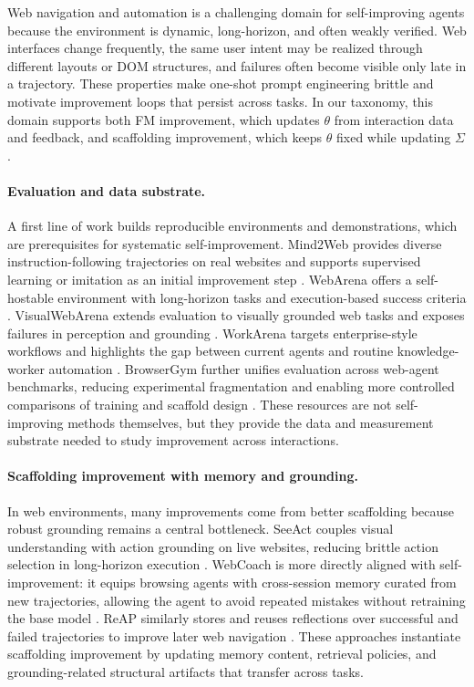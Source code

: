 Web navigation and automation is a challenging domain for self-improving agents because the environment is dynamic, long-horizon, and often weakly verified. Web interfaces change frequently, the same user intent may be realized through different layouts or DOM structures, and failures often become visible only late in a trajectory. These properties make one-shot prompt engineering brittle and motivate improvement loops that persist across tasks. In our taxonomy, this domain supports both FM improvement, which updates $\theta$ from interaction data and feedback, and scaffolding improvement, which keeps $\theta$ fixed while updating $\Sigma$.

\paragraph{Evaluation and data substrate.}
A first line of work builds reproducible environments and demonstrations, which are prerequisites for systematic self-improvement. Mind2Web provides diverse instruction-following trajectories on real websites and supports supervised learning or imitation as an initial improvement step \citep{deng2023mindweb}. WebArena offers a self-hostable environment with long-horizon tasks and execution-based success criteria \citep{zhou2024webarena}. VisualWebArena extends evaluation to visually grounded web tasks and exposes failures in perception and grounding \citep{koh2024visualwebarenaevaluatingmultimodalagents}. WorkArena targets enterprise-style workflows and highlights the gap between current agents and routine knowledge-worker automation \citep{drouin2024workarenacapablewebagents}. BrowserGym further unifies evaluation across web-agent benchmarks, reducing experimental fragmentation and enabling more controlled comparisons of training and scaffold design \citep{workarena2024, chezelles2025browsergym}. These resources are not self-improving methods themselves, but they provide the data and measurement substrate needed to study improvement across interactions.

\paragraph{Scaffolding improvement with memory and grounding.}
In web environments, many improvements come from better scaffolding because robust grounding remains a central bottleneck. SeeAct couples visual understanding with action grounding on live websites, reducing brittle action selection in long-horizon execution \citep{zheng2024gptvision}. WebCoach is more directly aligned with self-improvement: it equips browsing agents with cross-session memory curated from new trajectories, allowing the agent to avoid repeated mistakes without retraining the base model \citep{liu2025webcoachselfevolvingwebagents}. ReAP similarly stores and reuses reflections over successful and failed trajectories to improve later web navigation \citep{azam2025reflectionbasedmemorywebnavigation}. These approaches instantiate scaffolding improvement by updating memory content, retrieval policies, and grounding-related structural artifacts that transfer across tasks.

